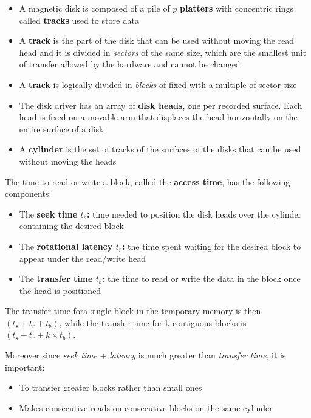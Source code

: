 \begin{itemize}
    \item A magnetic disk is composed of a pile of \(p\) \textbf{platters} with concentric rings called \textbf{tracks} used to store data
    \item A \textbf{track} is the part of the disk that can be used without moving the read head and it is divided in \textit{sectors} of the same size, which are the smallest unit of transfer allowed by the hardware and cannot be changed
    \item A \textbf{track} is logically divided in \textit{blocks} of fixed with a multiple of sector size
    \item The disk driver has an array of \textbf{disk heads}, one per recorded surface. Each head is fixed on a movable arm that displaces the head horizontally on the entire surface of a disk
    \item A \textbf{cylinder} is the set of tracks of the surfaces of the disks that can be used without moving the heads
\end{itemize}
The time to read or write a block, called the \textbf{access time}, has the following components:
\begin{itemize}
    \item The \textbf{seek time \(t_s\):} time needed to position the disk heads over the cylinder containing the desired block
    \item The \textbf{rotational latency \(t_r\):} the time spent waiting for the desired block to appear under the read/write head
    \item The \textbf{transfer time \(t_b\):} the time to read or write the data in the block once the head is positioned
\end{itemize}
The transfer time fora single block in the temporary memory is then \((t_s + t_r + t_b)\), while the transfer time for k contiguous blocks is \((t_s + t_r + k \times t_b)\).

Moreover since \textit{seek time} + \textit{latency} is much greater than \textit{transfer time}, it is important: 
\begin{itemize}
    \item To transfer greater blocks rather than small ones
    \item Makes consecutive reads on consecutive blocks on the  same cylinder
\end{itemize}

